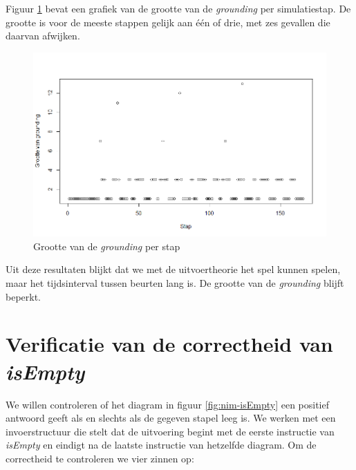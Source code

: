 Figuur \ref{fig:groundingsize} bevat een grafiek van de grootte van de \textit{grounding} per simulatiestap. De grootte is voor de meeste stappen gelijk aan \'e\'en of drie, met zes gevallen die daarvan afwijken.

\begin{figure}
	\includegraphics[width=1.05\textwidth]{chap-evaluatie/groundingsize.png}
	\caption{Grootte van de \textit{grounding} per stap}
	\label{fig:groundingsize}
\end{figure}

Uit deze resultaten blijkt dat we met de uitvoertheorie het spel kunnen spelen, maar het tijdsinterval tussen beurten lang is. De grootte van de \textit{grounding} blijft beperkt.

\section{Verificatie van de correctheid van \textit{isEmpty}}

We willen controleren of het diagram in figuur \ref{fig:nim-isEmpty} een positief antwoord geeft als en slechts als de gegeven stapel leeg is. We werken met een invoerstructuur die stelt dat de uitvoering begint met de eerste instructie van \textit{isEmpty} en eindigt na de laatste instructie van hetzelfde diagram. Om de correctheid te controleren we vier zinnen op:

